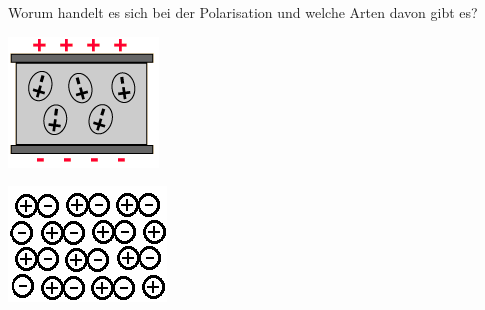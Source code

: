 \begin{lk}{Worum handelt es sich bei der Polarisation und welche Arten davon gibt es?}
\begin{center}
\begin{minipage}{0.18\textwidth}
		\end{minipage}
		\begin{minipage}{0.18\textwidth}
			\includegraphics[width=\textwidth]{pics/ES_Orientierungspolarisation.png}\\ %
		\end{minipage}
		\begin{minipage}{0.18\textwidth}
			\includegraphics[width=\textwidth]{pics/ES_Ionenpolarisation.png}\\ %
		\end{minipage}
	\end{center}
\end{lk}

